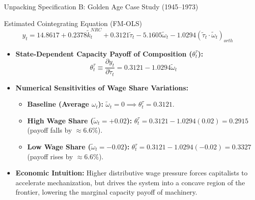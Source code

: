 \documentclass[10pt]{beamer}
\begin{document}
\begin{frame}{Unpacking Specification B: Golden Age Case Study (1945--1973)}
  \begin{block}{Estimated Cointegrating Equation (FM-OLS)}
    $$y_t = 14.8617 + 0.2378 \tilde{k}^{NRC}_t + 0.3121 \tilde{\tau}_t - 5.1605 \tilde{\omega}_t - 1.0294 (\tilde{\tau}_t \cdot \tilde{\omega}_t)_{orth}$$
  \end{block}
  \begin{itemize}
    \item \textbf{State-Dependent Capacity Payoff of Composition ($\theta^{\tau}_t$):}
      $$\theta^{\tau}_t \equiv \frac{\partial y_t}{\partial \tilde{\tau}_t} = 0.3121 - 1.0294 \tilde{\omega}_t$$
    \item \textbf{Numerical Sensitivities of Wage Share Variations:}
      \begin{itemize}
        \item \textbf{Baseline (Average $\omega_t$):} $\tilde{\omega}_t = 0 \implies \theta^{\tau}_t = \mathbf{0.3121}$.
        \item \textbf{High Wage Share ($\tilde{\omega}_t = +0.02$):} $\theta^{\tau}_t = 0.3121 - 1.0294(0.02) = \mathbf{0.2915}$ (payoff falls by $\approx 6.6\%$).
        \item \textbf{Low Wage Share ($\tilde{\omega}_t = -0.02$):} $\theta^{\tau}_t = 0.3121 - 1.0294(-0.02) = \mathbf{0.3327}$ (payoff rises by $\approx 6.6\%$).
      \end{itemize}
    \item \textbf{Economic Intuition:} Higher distributive wage pressure forces capitalists to accelerate mechanization, but drives the system into a concave region of the frontier, lowering the marginal capacity payoff of machinery.
  \end{itemize}
\end{frame}
\end{document}
